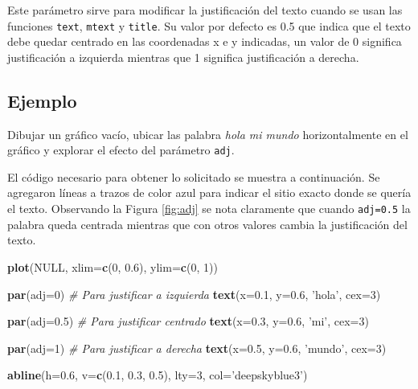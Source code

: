 \documentclass[10pt,]{krantz}
\makeatletter
\newenvironment{Shaded}{\begin{snugshade}}{\end{snugshade}}
\newcommand{\KeywordTok}[1]{\textcolor[rgb]{0.13,0.29,0.53}{\textbf{#1}}}
\newcommand{\DataTypeTok}[1]{\textcolor[rgb]{0.13,0.29,0.53}{#1}}
\newcommand{\DecValTok}[1]{\textcolor[rgb]{0.00,0.00,0.81}{#1}}
\newcommand{\FloatTok}[1]{\textcolor[rgb]{0.00,0.00,0.81}{#1}}
\newcommand{\StringTok}[1]{\textcolor[rgb]{0.31,0.60,0.02}{#1}}
\newcommand{\CommentTok}[1]{\textcolor[rgb]{0.56,0.35,0.01}{\textit{#1}}}
\newcommand{\OtherTok}[1]{\textcolor[rgb]{0.56,0.35,0.01}{#1}}
\newcommand{\NormalTok}[1]{#1}
\newenvironment{kframe}{%
\medskip{}
\setlength{\fboxsep}{.8em}
 \def\at@end@of@kframe{}%
 \ifinner\ifhmode%
  \def\at@end@of@kframe{\end{minipage}}%
  \begin{minipage}{\columnwidth}%
 \fi\fi%
 \def\FrameCommand##1{\hskip\@totalleftmargin \hskip-\fboxsep
 \colorbox{shadecolor}{##1}\hskip-\fboxsep
     \hskip-\linewidth \hskip-\@totalleftmargin \hskip\columnwidth}%
 \MakeFramed {\advance\hsize-\width
   \@totalleftmargin\z@ \linewidth\hsize
   \@setminipage}}%
 {\par\unskip\endMakeFramed%
 \at@end@of@kframe}
\renewenvironment{Shaded}{\begin{kframe}}{\end{kframe}}
\makeatother
\begin{document}
Este parámetro sirve para modificar la justificación del texto cuando se
usan las funciones \texttt{text}, \texttt{mtext} y \texttt{title}. Su
valor por defecto es 0.5 que indica que el texto debe quedar centrado en
las coordenadas x e y indicadas, un valor de 0 significa justificación a
izquierda mientras que 1 significa justificación a derecha.

\subsection*{Ejemplo}\label{ejemplo-34}


Dibujar un gráfico vacío, ubicar las palabra \emph{hola mi mundo}
horizontalmente en el gráfico y explorar el efecto del parámetro
\texttt{adj}.

El código necesario para obtener lo solicitado se muestra a
continuación. Se agregaron líneas a trazos de color azul para indicar el
sitio exacto donde se quería el texto. Observando la Figura
\ref{fig:adj} se nota claramente que cuando \texttt{adj=0.5} la palabra
queda centrada mientras que con otros valores cambia la justificación
del texto.

\begin{Shaded}
\begin{Highlighting}[]
\KeywordTok{plot}\NormalTok{(}\OtherTok{NULL}\NormalTok{, }\DataTypeTok{xlim=}\KeywordTok{c}\NormalTok{(}\DecValTok{0}\NormalTok{, }\FloatTok{0.6}\NormalTok{), }\DataTypeTok{ylim=}\KeywordTok{c}\NormalTok{(}\DecValTok{0}\NormalTok{, }\DecValTok{1}\NormalTok{))}

\KeywordTok{par}\NormalTok{(}\DataTypeTok{adj=}\DecValTok{0}\NormalTok{)  }\CommentTok{# Para justificar a izquierda}
\KeywordTok{text}\NormalTok{(}\DataTypeTok{x=}\FloatTok{0.1}\NormalTok{, }\DataTypeTok{y=}\FloatTok{0.6}\NormalTok{, }\StringTok{'hola'}\NormalTok{, }\DataTypeTok{cex=}\DecValTok{3}\NormalTok{)}

\KeywordTok{par}\NormalTok{(}\DataTypeTok{adj=}\FloatTok{0.5}\NormalTok{)  }\CommentTok{# Para justificar centrado}
\KeywordTok{text}\NormalTok{(}\DataTypeTok{x=}\FloatTok{0.3}\NormalTok{, }\DataTypeTok{y=}\FloatTok{0.6}\NormalTok{, }\StringTok{'mi'}\NormalTok{, }\DataTypeTok{cex=}\DecValTok{3}\NormalTok{)}

\KeywordTok{par}\NormalTok{(}\DataTypeTok{adj=}\DecValTok{1}\NormalTok{)  }\CommentTok{# Para justificar a derecha}
\KeywordTok{text}\NormalTok{(}\DataTypeTok{x=}\FloatTok{0.5}\NormalTok{, }\DataTypeTok{y=}\FloatTok{0.6}\NormalTok{, }\StringTok{'mundo'}\NormalTok{, }\DataTypeTok{cex=}\DecValTok{3}\NormalTok{)}

\KeywordTok{abline}\NormalTok{(}\DataTypeTok{h=}\FloatTok{0.6}\NormalTok{, }\DataTypeTok{v=}\KeywordTok{c}\NormalTok{(}\FloatTok{0.1}\NormalTok{, }\FloatTok{0.3}\NormalTok{, }\FloatTok{0.5}\NormalTok{),}
       \DataTypeTok{lty=}\DecValTok{3}\NormalTok{, }\DataTypeTok{col=}\StringTok{'deepskyblue3'}\NormalTok{)}
\end{Highlighting}
\end{Shaded}
\end{document}
